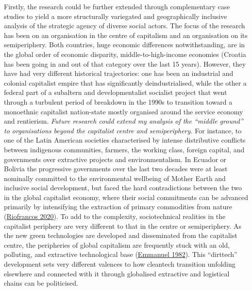 \documentclass[a4paper, nobind]{templates/ociamthesis}
\begin{document}
Firstly, the research could be further extended through complementary case studies to yield a more structurally variegated and geographically inclusive analysis of the strategic agency of diverse social actors. The focus of the research has been on an organisation in the centre of capitalism and an organisation on its semiperiphery. Both countries, huge economic differences notwithstanding, are in the global order of economic disparity, middle-to-high-income economies (Croatia has been going in and out of that category over the last 15 years). However, they have had very different historical trajectories: one has been an industrial and colonial capitalist empire that has significantly deindustrialised, while the other a federal part of a subaltern and developmentalist socialist project that went through a turbulent period of breakdown in the 1990s to transition toward a monoethnic capitalist nation-state mostly organised around the service economy and rentierism. \emph{Future research could extend my analysis of the ``middle ground'' to organisations beyond the capitalist centre and semiperiphery.} For instance, to one of the Latin American societies characterised by intense distributive conflicts between indigenous communities, farmers, the working class, foreign capital, and governments over extractive projects and environmentalism. In Ecuador or Bolivia the progressive governments over the last two decades were at least nominally committed to the environmental wellbeing of Mother Earth and inclusive social development, but faced the hard contradictions between the two in the global capitalist economy, where their social commitments can be advanced primarily by intensifying the extraction of primary commodities from nature (\protect\hyperlink{ref-riofrancos_resource_2020}{Riofrancos 2020}). To add to the complexity, sociotechnical realities in the capitalist periphery are very different to that in the centre or semiperiphery. As the new green technologies are developed and disseminated from the capitalist centre, the peripheries of global capitalism are frequently stuck with an old, polluting, and extractive technological base (\protect\hyperlink{ref-emmanuel_appropriate_1982}{Emmanuel 1982}). This ``dirttech'' development sets very different valences to how cleantech transition unfolding elsewhere and connected with it through globalised extractive and logistical chains can be politicised.
\end{document}
